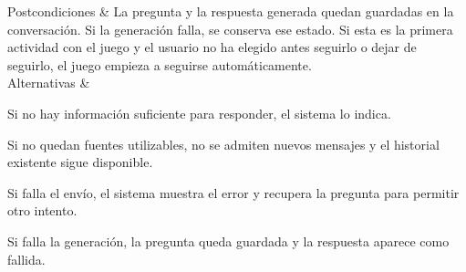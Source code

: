 \begin{longtblr}[
    caption={\textbf{CU-23}. Consultar una duda sobre las reglas.},
    label={tab:cu:CU-23}
]
        Postcondiciones & La pregunta y la respuesta generada quedan guardadas en la conversación. Si la generación falla, se conserva ese estado. Si esta es la primera actividad con el juego y el usuario no ha elegido antes seguirlo o dejar de seguirlo, el juego empieza a seguirse automáticamente. \\
        Alternativas & \begin{alternativasCU}
            \item Si no hay información suficiente para responder, el sistema lo indica.
            \item Si no quedan fuentes utilizables, no se admiten nuevos mensajes y el historial existente sigue disponible.
            \item Si falla el envío, el sistema muestra el error y recupera la pregunta para permitir otro intento.
            \item Si falla la generación, la pregunta queda guardada y la respuesta aparece como fallida.
        \end{alternativasCU} \\
\end{longtblr}

\clearpage

